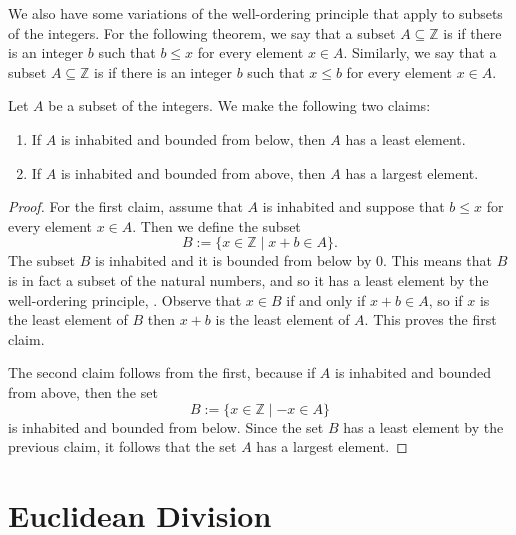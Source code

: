 We also have some variations of the well-ordering principle that apply to subsets of the integers. For the following theorem, we say that a subset $A\subseteq \mathbb{Z}$ is  if there is an integer $b$ such that $b\leq x$ for every element $x\in A$. Similarly, we say that a subset $A\subseteq \mathbb{Z}$ is  if there is an integer $b$ such that $x\leq b$ for every element $x\in A$.

\begin{theorem}\label{theorem:well-ordering-integers}
  Let $A$ be a subset of the integers. We make the following two claims:
  \begin{enumerate}
  \item If $A$ is inhabited and bounded from below, then $A$ has a least element.
  \item If $A$ is inhabited and bounded from above, then $A$ has a largest element.
  \end{enumerate}
\end{theorem}

\begin{proof}
  For the first claim, assume that $A$ is inhabited and suppose that $b\leq x$ for every element $x\in A$. Then we define the subset
  \begin{equation*}
    B := \{x\in \mathbb{Z}\mid x+b \in A\}.
  \end{equation*}
  The subset $B$ is inhabited and it is bounded from below by $0$. This means that $B$ is in fact a subset of the natural numbers, and so it has a least element by the well-ordering principle, . Observe that $x\in B$ if and only if $x+b\in A$, so if $x$ is the least element of $B$ then $x+b$ is the least element of $A$. This proves the first claim.

  The second claim follows from the first, because if $A$ is inhabited and bounded from above, then the set
  \begin{equation*}
    B := \{x\in \mathbb{Z}\mid -x\in A\}
  \end{equation*}
  is inhabited and bounded from below. Since the set $B$ has a least element by the previous claim, it follows that the set $A$ has a largest element.
\end{proof}

\section{Euclidean Division}

